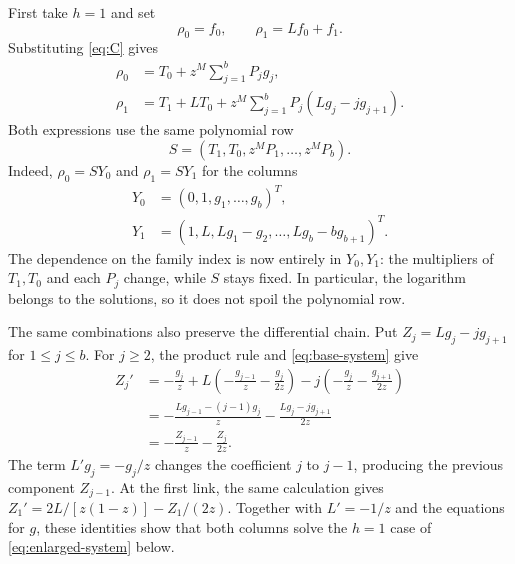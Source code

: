 First take $h=1$ and set
\[
 \rho_0=f_0,\qquad \rho_1=Lf_0+f_1.
\]
Substituting \eqref{eq:C} gives
\begin{align*}
 \rho_0&=T_0+z^M\sum_{j=1}^b P_jg_j,\\
 \rho_1&=T_1+LT_0+z^M\sum_{j=1}^b P_j(Lg_j-jg_{j+1}).
\end{align*}
Both expressions use the same polynomial row
\[
 S=(T_1,T_0,z^MP_1,\ldots,z^MP_b).
\]
Indeed, $\rho_0=SY_0$ and $\rho_1=SY_1$ for the columns
\[
 \begin{aligned}
 Y_0&=(0,1,g_1,\ldots,g_b)^T,\\
 Y_1&=(1,L,Lg_1-g_2,\ldots,Lg_b-bg_{b+1})^T.
 \end{aligned}
\]
The dependence on the family index is now entirely in $Y_0,Y_1$:
the multipliers of $T_1,T_0$ and each $P_j$ change, while $S$ stays
fixed. In particular, the logarithm belongs to the solutions, so it
does not spoil the polynomial row.

The same combinations also preserve the differential chain. Put
$Z_j=Lg_j-jg_{j+1}$ for $1\leq j\leq b$. For $j\geq2$, the product
rule and \eqref{eq:base-system} give
\begin{align*}
 Z_j'&=-\frac{g_j}{z}
       +L\left(-\frac{g_{j-1}}z-\frac{g_j}{2z}\right)
       -j\left(-\frac{g_j}z-\frac{g_{j+1}}{2z}\right)\\
     &=-\frac{Lg_{j-1}-(j-1)g_j}{z}
       -\frac{Lg_j-jg_{j+1}}{2z}\\
     &=-\frac{Z_{j-1}}z-\frac{Z_j}{2z}.
\end{align*}
The term $L'g_j=-g_j/z$ changes the coefficient $j$ to $j-1$,
producing the previous component $Z_{j-1}$.
At the first link, the same calculation gives
$Z_1'=2L/[z(1-z)]-Z_1/(2z)$.
Together with $L'=-1/z$ and the equations for $g$, these identities
show that both columns solve the $h=1$ case of
\eqref{eq:enlarged-system} below.

